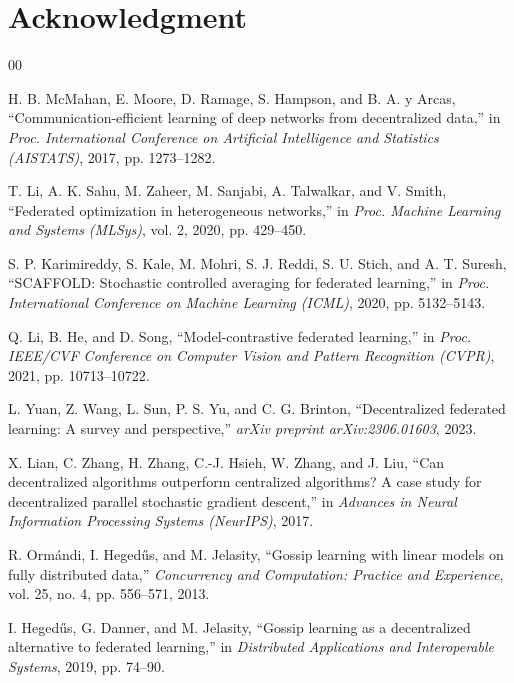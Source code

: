 \documentclass[conference]{IEEEtran}
\begin{document}
\section*{Acknowledgment}

\begin{thebibliography}{00}

H. B. McMahan, E. Moore, D. Ramage, S. Hampson, and B. A. y Arcas, ``Communication-efficient learning of deep networks from decentralized data,'' in \emph{Proc. International Conference on Artificial Intelligence and Statistics (AISTATS)}, 2017, pp. 1273--1282.

T. Li, A. K. Sahu, M. Zaheer, M. Sanjabi, A. Talwalkar, and V. Smith, ``Federated optimization in heterogeneous networks,'' in \emph{Proc. Machine Learning and Systems (MLSys)}, vol. 2, 2020, pp. 429--450.

S. P. Karimireddy, S. Kale, M. Mohri, S. J. Reddi, S. U. Stich, and A. T. Suresh, ``SCAFFOLD: Stochastic controlled averaging for federated learning,'' in \emph{Proc. International Conference on Machine Learning (ICML)}, 2020, pp. 5132--5143.

Q. Li, B. He, and D. Song, ``Model-contrastive federated learning,'' in \emph{Proc. IEEE/CVF Conference on Computer Vision and Pattern Recognition (CVPR)}, 2021, pp. 10713--10722.

L. Yuan, Z. Wang, L. Sun, P. S. Yu, and C. G. Brinton, ``Decentralized federated learning: A survey and perspective,'' \emph{arXiv preprint arXiv:2306.01603}, 2023.

X. Lian, C. Zhang, H. Zhang, C.-J. Hsieh, W. Zhang, and J. Liu, ``Can decentralized algorithms outperform centralized algorithms? A case study for decentralized parallel stochastic gradient descent,'' in \emph{Advances in Neural Information Processing Systems (NeurIPS)}, 2017.

R. Orm\'{a}ndi, I. Heged\H{u}s, and M. Jelasity, ``Gossip learning with linear models on fully distributed data,'' \emph{Concurrency and Computation: Practice and Experience}, vol. 25, no. 4, pp. 556--571, 2013.

I. Heged\H{u}s, G. Danner, and M. Jelasity, ``Gossip learning as a decentralized alternative to federated learning,'' in \emph{Distributed Applications and Interoperable Systems}, 2019, pp. 74--90.


\end{thebibliography}
\end{document}

